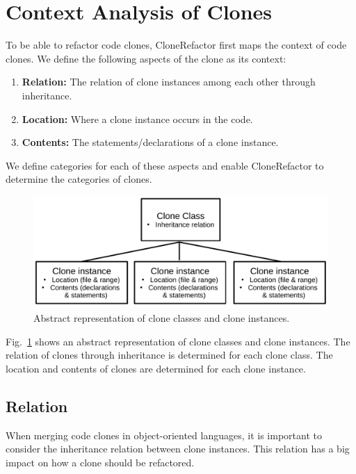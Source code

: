 \section{Context Analysis of Clones}\label{chap:contextsetup}
To be able to refactor code clones, CloneRefactor first maps the context of code clones. We define the following aspects of the clone as its context:
\begin{enumerate}
  \item \textbf{Relation:} The relation of clone instances among each other through inheritance.
  \item \textbf{Location:} Where a clone instance occurs in the code.
  \item \textbf{Contents:} The statements/declarations of a clone instance.
\end{enumerate}
We define categories for each of these aspects and enable CloneRefactor to determine the categories of clones.

\begin{figure}[H]
  \centering
    \includegraphics[width=0.8\columnwidth]{img/context}
    \caption{Abstract representation of clone classes and clone instances.}
  \label{fig:clonecontext}
\end{figure}

Fig.~\ref{fig:clonecontext} shows an abstract representation of clone classes and clone instances. The relation of clones through inheritance is determined for each clone class. The location and contents of clones are determined for each clone instance.

\subsection{Relation}\label{sec:setuprelation}
When merging code clones in object-oriented languages, it is important to consider the inheritance relation between clone instances. This relation has a big impact on how a clone should be refactored.

